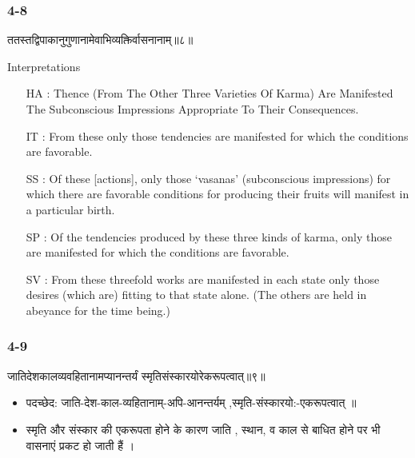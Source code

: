 \begin{frame}[fragile]\frametitle{4-8}
\begin{sanskrit}
ततस्तद्विपाकानुगुणानामेवाभिव्यक्तिर्वासनानाम्॥८॥
\end{sanskrit}

Interpretations
\begin{itemize}	
\item [HA]: Thence (From The Other Three Varieties Of Karma) Are Manifested The Subconscious Impressions Appropriate To Their Consequences.
\item [IT]: From these only those tendencies are manifested for which the conditions are favorable.
\item [SS]: Of these [actions], only those `vasanas' (subconscious impressions) for which there are favorable conditions for producing their fruits will manifest in a particular birth.
\item [SP]: Of the tendencies produced by these three kinds of karma, only those are manifested for which the conditions are favorable.
\item [SV]: From these threefold works are manifested in each state only those desires (which are) fitting to that state alone. (The others are held in abeyance for the time being.) 
\end{itemize}
\end{frame}

\begin{frame}[fragile]\frametitle{4-9}
\begin{sanskrit}
जातिदेशकालव्यवहितानामप्यानन्तर्यं स्मृतिसंस्कारयोरेकरूपत्वात्॥९॥
\end{sanskrit}

\begin{itemize}
\item पदच्छेद:  जाति-देश-काल-व्यहितानाम्-अपि-‌आनन्तर्यम् ,स्मृति-संस्कारयो:-एकरूपत्वात् ॥
\item स्मृति और संस्कार की एकरूपता होने के कारण जाति , स्थान, व काल से बाधित होने पर भी वासनाएं प्रकट हो जाती हैं ।
\end{itemize}
\end{frame}

